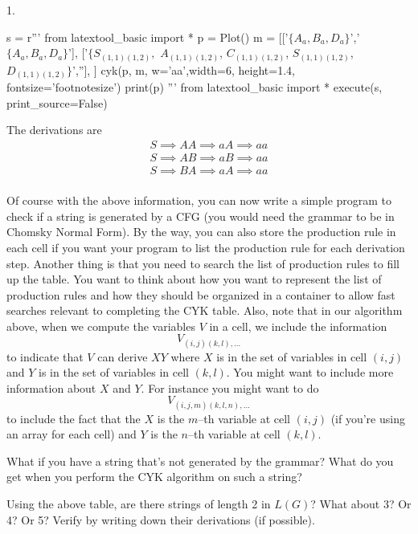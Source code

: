 1. 
\begin{python}
s = r'''
from latextool_basic import *
p = Plot()
m = [['$\{A_a,B_a,D_a\}$','$\{A_a,B_a,D_a\}$'],
     ['$\{S_{(1,1)(1,2)},$ $A_{(1,1)(1,2)}$, $C_{(1,1)(1,2)}$, $S_{(1,1)(1,2)}$, $D_{(1,1)(1,2)} \}$',''],
     ]
cyk(p, m, w='aa',width=6, height=1.4, fontsize='footnotesize')
print(p)
'''
from latextool_basic import *
execute(s, print_source=False)
\end{python}
The derivations are
\begin{align*}
  S \implies AA \implies aA \implies aa \\
  S \implies AB \implies aB \implies aa \\
  S \implies BA \implies aA \implies aa \\
\end{align*}

\newpage
\begin{ex}
Of course with the above information, you can now
write a simple program to check if a string is generated by a CFG (you
would need the grammar to be in Chomsky Normal Form).
By the way, you can also store the production rule in each cell if you
want your program to list the production rule for each derivation
step. Another thing is that you need to search the list of production 
rules to fill up the table.
You want to think about how you want to represent the list of
production rules and how they should be
organized in a container to allow fast searches relevant to
completing the CYK table.
Also, note that in our algorithm above, when we compute
the variables $V$ in a cell, we include the information
\[
  V_{(i,j)(k,l), ...}
\]
to indicate that $V$ can derive $XY$ where $X$ is in the
set of variables in cell $(i,j)$ and $Y$ is in the set of variables
in cell $(k,l)$.
You might want to include more information about $X$ and $Y$.
For instance you might want to
do
\[
  V_{(i,j,m)(k,l,n), ...}
\]
to include the fact that the $X$ is the $m$--th variable at cell $(i,j)$
(if you're using an array for each cell)
and $Y$ is the $n$--th variable at cell $(k,l)$.
\end{ex}

\newpage
\begin{ex}
What if you have a string that's not generated by the grammar?
What do you get when you perform the CYK algorithm on such a string?
\end{ex}

\newpage
\begin{ex}
Using the above table, are there strings of length 2 in $L(G)$?
What about 3? Or 4? Or 5?
Verify by writing down their derivations (if possible).
\end{ex}



